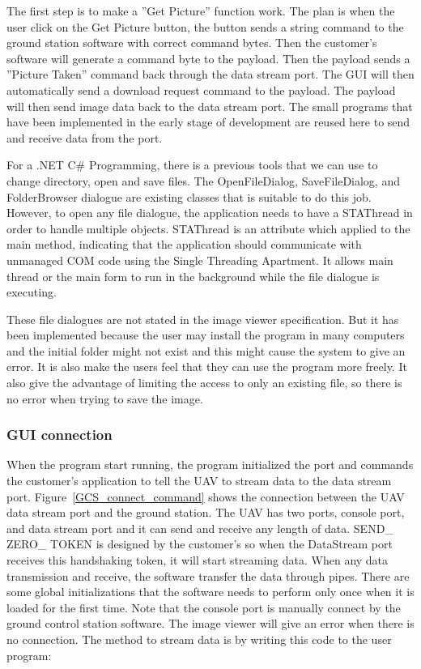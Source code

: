 \documentclass[oneside]{ecsgdp}         %
\begin{document}
The first step is to make a ''Get Picture'' function work. The plan is when the user click on the Get Picture button, the button sends a string command to the ground station software with correct command bytes. Then the customer's software will generate a command byte to the payload. Then the payload sends a ''Picture Taken'' command back through the data stream port. The GUI will then automatically send a download request command to the payload. The payload will then send image data back to the data stream port. The small programs that have been implemented in the early stage of development are reused here to send and receive data from the port. 

For a .NET C\# Programming, there is a previous tools that we can use to change directory, open and save files. The OpenFileDialog,  SaveFileDialog, and FolderBrowser dialogue are existing classes that is suitable to do this job. However, to open any file dialogue, the application needs to have a STAThread in order to handle multiple objects. STAThread is an attribute which applied to the main method, indicating that the application should communicate with unmanaged COM code using the Single Threading Apartment. It allows main thread or the main form to run in the background while the file dialogue is executing. 

These file dialogues are not stated in the image viewer specification. But it has been implemented because the user may install the program in many computers and the initial folder might not exist and this might cause the system to give an error. It is also make the users feel that they can use the program more freely.  It also give the advantage of limiting the access to only an existing file, so there is no error when trying to save the image.

\subsubsection*{GUI connection}
 When the program start running, the program initialized the port and commands the customer’s application to tell the UAV to stream data to the data stream port. Figure~\ref{GCS_connect_command} shows the connection between the UAV data stream port and the ground station. The UAV has two ports, console port, and data stream port and it can send and receive any length of data. SEND\_ ZERO\_ TOKEN is designed by the customer’s so when the DataStream port receives this handshaking token, it will start streaming data. When any data transmission and receive, the software transfer the data through pipes. There are some global initializations that the software needs to perform only once when it is loaded for the first time. Note that the console port is manually connect by the ground control station software. The image viewer will give an error when there is no connection.
 The method to stream data is by writing this code to the user program:
 
\end{document}
